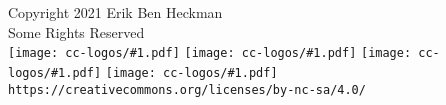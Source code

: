 \pagestyle{empty}
\newcommand\cclogo[1]{%
\texttt{[image: cc-logos/\#1.pdf]}%
}
\null\vfill
\begin{center}
\begin{footnotesize}
Copyright 2021 Erik Ben Heckman\\%
Some Rights Reserved\\[1ex]%
\cclogo{cc} \cclogo{by} \cclogo{nc} \cclogo{sa}\\[-0.5ex]%
\texttt{https://creativecommons.org/licenses/by-nc-sa/4.0/}
\end{footnotesize}
\end{center}
